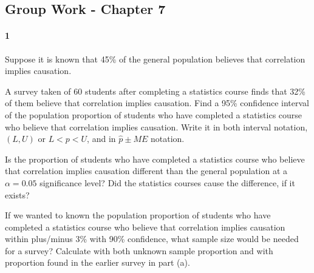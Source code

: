 \documentclass{article}
\begin{document}
\begin{flushleft}
\section*{Group Work - Chapter 7}
\paragraph{1} Suppose it is known that 45\% of the general population believes that correlation implies causation.
\begin{enumalpha}
\item A survey taken of 60 students after completing a statistics course finds that 32\% of them believe that correlation implies causation. Find a 95\% confidence interval of the population proportion of students who have completed a statistics course who believe that correlation implies causation. Write it in both interval notation, $(L, U)$ or $L < p < U$, and in $\hat p \pm ME$ notation.
\vspace{2in}
\item Is the proportion of students who have completed a statistics course who believe that correlation implies causation different than the general population at a $\alpha = 0.05$ significance level? Did the statistics courses cause the difference, if it exists?

\vspace{2.25in}
\item If we wanted to known the population proportion of students who have completed a statistics course who believe that correlation implies causation within plus/minus 3\% with 90\% confidence, what sample size would be needed for a survey? Calculate with both unknown sample proportion and with proportion found in the earlier survey in part (a).
\end{enumalpha}



\newpage

\end{flushleft}
\end{document}
